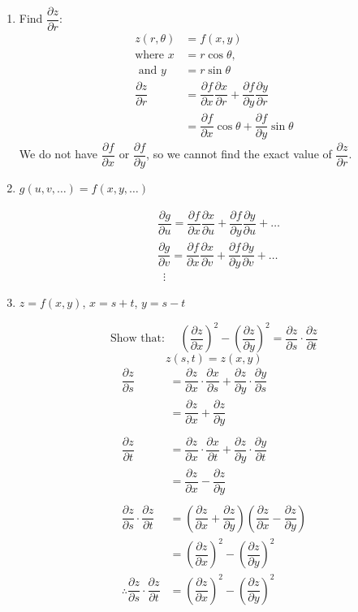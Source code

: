 \documentclass[a4paper,12pt,openany]{book}
\newcommand{\pd}[2]{\dfrac{\partial #1}{\partial #2}}
\begin{document}
\begin{enumerate}
    
    \item Find $\pd{z}{r}$:
        \begin{align*}
        z(r,\theta) &= f(x, y)\\
        \text{where } x &= r\cos\theta,\\
        \text{ and } y &= r\sin\theta\\
        \pd{z}{r} &= \pd{f}{x}\pd{x}{r} + \pd{f}{y}\pd{y}{r}\\
        &= \pd{f}{x}\cos\theta + \pd{f}{y}\sin\theta
    \end{align*}
    We do not have $\pd{f}{x}$ or $\pd{f}{y}$, so we cannot find the exact value of $\pd{z}{r}$.

    \item $g(u, v, \ldots) = f(x, y, \ldots)$
    
    \begin{align*}
        &\pd{g}{u} = \pd{f}{x}\pd{x}{u} + \pd{f}{y}\pd{y}{u} + \ldots\\
        &\pd{g}{v} = \pd{f}{x}\pd{x}{v} + \pd{f}{y}\pd{y}{v} + \ldots\\
        &\,\,\,\vdots
    \end{align*}

    \item $z = f(x, y)$, $x = s + t$, $y = s - t$
    
        
        \[
            \text{Show that: }\quad \left(\pd{z}{x}\right)^2 - \left(\pd{z}{y}\right)^2 = \pd{z}{s} \cdot \pd{z}{t}
        \]
        \[
            z(s, t) = z(x, y)
        \]
        \begin{align*}
            \pd{z}{s} &= \pd{z}{x}\cdot\pd{x}{s} + \pd{z}{y}\cdot\pd{y}{s}\\
            &= \pd{z}{x} + \pd{z}{y}\\\\
            \pd{z}{t} &= \pd{z}{x}\cdot\pd{x}{t} + \pd{z}{y}\cdot\pd{y}{t}\\
            &= \pd{z}{x} - \pd{z}{y}\\\\
            \pd{z}{s}\cdot\pd{z}{t} &= \left(\pd{z}{x} + \pd{z}{y}\right)\left(\pd{z}{x} - \pd{z}{y}\right)\\
            &= \left(\pd{z}{x}\right)^2 - \left(\pd{z}{y}\right)^2\\
            \therefore \pd{z}{s}\cdot\pd{z}{t} &= \left(\pd{z}{x}\right)^2 - \left(\pd{z}{y}\right)^2
        \end{align*}

\end{enumerate}
\end{document}
